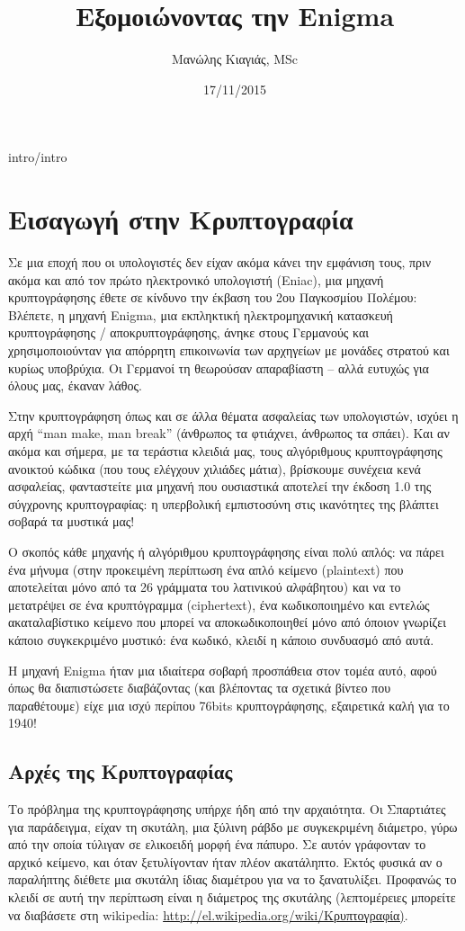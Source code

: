 \documentclass[a4paper,twoside,12pt]{article}
\author{Μανώλης Κιαγιάς, MSc}
\title {Εξομοιώνοντας την Enigma}
\date{17/11/2015}
\begin{document}
%
\maketitle
%
\cleardoublepage
%
 {intro/intro}
%
\section{Εισαγωγή στην Κρυπτογραφία}
%
Σε μια εποχή που οι υπολογιστές δεν είχαν ακόμα κάνει την εμφάνιση τους, πριν ακόμα και από τον πρώτο ηλεκτρονικό υπολογιστή (Eniac), μια μηχανή κρυπτογράφησης έθετε σε κίνδυνο την έκβαση του 2ου Παγκοσμίου Πολέμου: Βλέπετε, η μηχανή Enigma, μια εκπληκτική ηλεκτρομηχανική κατασκευή κρυπτογράφησης / αποκρυπτογράφησης, άνηκε στους Γερμανούς και χρησιμοποιούνταν για απόρρητη επικοινωνία των αρχηγείων με μονάδες στρατού και κυρίως υποβρύχια. Οι Γερμανοί τη θεωρούσαν απαραβίαστη – αλλά ευτυχώς για όλους μας, έκαναν λάθος.

Στην κρυπτογράφηση όπως και σε άλλα θέματα ασφαλείας των υπολογιστών, ισχύει η αρχή ``man make, man break'' (άνθρωπος τα φτιάχνει, άνθρωπος τα σπάει). Και αν ακόμα και σήμερα, με τα τεράστια κλειδιά μας, τους αλγόριθμους κρυπτογράφησης ανοικτού κώδικα (που τους ελέγχουν χιλιάδες μάτια), βρίσκουμε συνέχεια κενά ασφαλείας, φανταστείτε μια μηχανή που ουσιαστικά αποτελεί την έκδοση 1.0 της σύγχρονης κρυπτογραφίας: η υπερβολική εμπιστοσύνη στις ικανότητες της βλάπτει σοβαρά τα μυστικά μας!

Ο σκοπός κάθε μηχανής ή αλγόριθμου κρυπτογράφησης είναι πολύ απλός: να πάρει ένα μήνυμα (στην προκειμένη περίπτωση ένα απλό κείμενο (plaintext) που αποτελείται μόνο από τα 26 γράμματα του λατινικού αλφάβητου) και να το μετατρέψει σε ένα κρυπτόγραμμα (ciphertext), ένα κωδικοποιημένο και εντελώς ακαταλαβίστικο κείμενο που μπορεί να αποκωδικοποιηθεί μόνο από όποιον γνωρίζει κάποιο συγκεκριμένο μυστικό: ένα κωδικό, κλειδί η κάποιο συνδυασμό από αυτά. 

Η μηχανή Enigma ήταν μια ιδιαίτερα σοβαρή προσπάθεια στον τομέα αυτό, αφού όπως θα διαπιστώσετε διαβάζοντας (και βλέποντας τα σχετικά βίντεο που παραθέτουμε) είχε μια ισχύ περίπου 76bits κρυπτογράφησης, εξαιρετικά καλή για το 1940!

\subsection{Αρχές της Κρυπτογραφίας}

Το πρόβλημα της κρυπτογράφησης υπήρχε ήδη από την αρχαιότητα. Οι Σπαρτιάτες για παράδειγμα, είχαν τη σκυτάλη, μια ξύλινη ράβδο με συγκεκριμένη διάμετρο, γύρω από την οποία τύλιγαν σε ελικοειδή μορφή ένα πάπυρο. Σε αυτόν γράφονταν το αρχικό κείμενο, και όταν ξετυλίγονταν ήταν πλέον ακατάληπτο. Εκτός φυσικά αν ο παραλήπτης διέθετε μια σκυτάλη ίδιας διαμέτρου για να το ξανατυλίξει. Προφανώς το κλειδί σε αυτή την περίπτωση είναι η διάμετρος της σκυτάλης (λεπτομέρειες μπορείτε να διαβάσετε στη wikipedia: \url{http://el.wikipedia.org/wiki/Κρυπτογραφία)}.
\end{document}
